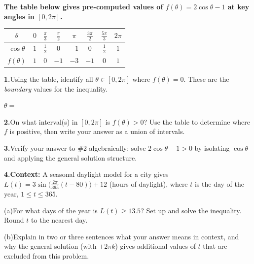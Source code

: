 \documentclass[10pt]{article}
\begin{document}
\begin{tcolorbox}[colback=white, colframe=black!40,
    title=\textbf{Tier E --- Extend},
    fonttitle=\bfseries, arc=2mm, left=3mm, right=3mm, top=2mm, bottom=2mm]

\textbf{The table below gives pre-computed values of $f(\theta) = 2\cos\theta - 1$
at key angles in $[0, 2\pi]$.}

\vspace{4pt}
\begin{center}
\renewcommand{\arraystretch}{1.4}
\begin{tabular}{|c|c|c|c|c|c|c|c|}
\hline
$\theta$ & $0$ & $\tfrac{\pi}{3}$ & $\tfrac{\pi}{2}$ & $\pi$ & $\tfrac{3\pi}{2}$ & $\tfrac{5\pi}{3}$ & $2\pi$ \\
\hline
$\cos\theta$ & $1$ & $\tfrac{1}{2}$ & $0$ & $-1$ & $0$ & $\tfrac{1}{2}$ & $1$ \\
\hline
$f(\theta)$ & $1$ & $0$ & $-1$ & $-3$ & $-1$ & $0$ & $1$ \\
\hline
\end{tabular}
\end{center}

\vspace{6pt}
\textbf{1.}\quad Using the table, identify all $\theta \in [0, 2\pi]$ where
$f(\theta) = 0$. These are the \emph{boundary} values for the inequality.

$\theta = $ \underline{\hspace{4cm}}

\vspace{0.10in}
\textbf{2.}\quad On what interval(s) in $[0, 2\pi]$ is $f(\theta) > 0$?
Use the table to determine where $f$ is positive, then write your answer
as a union of intervals.


\vspace{0.10in}
\textbf{3.}\quad Verify your answer to \#2 algebraically: solve $2\cos\theta - 1 > 0$
by isolating $\cos\theta$ and applying the general solution structure.

\vspace{0.10in}
\textbf{4.}\quad \textbf{Context:} A seasonal daylight model for a city gives
$L(t) = 3\sin\!\bigl(\tfrac{2\pi}{365}(t - 80)\bigr) + 12$ (hours of daylight),
where $t$ is the day of the year, $1 \le t \le 365$.

(a)\quad For what days of the year is $L(t) \ge 13.5$? Set up and solve the
inequality. Round $t$ to the nearest day.

(b)\quad Explain in two or three sentences what your answer means in context,
and why the general solution (with $+2\pi k$) gives additional values of $t$
that are excluded from this problem.

\end{tcolorbox}
\end{document}
